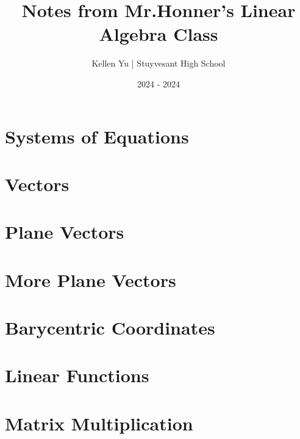 \documentclass[12pt]{book}
\title{Notes from Mr.Honner's Linear Algebra Class}
\author{Kellen Yu | Stuyvesant High School}
\date{2024 - 2024}
\begin{document}
    \maketitle
    \tableofcontents
    \section{Systems of Equations}
    
    \section{Vectors}
    
    \section{Plane Vectors}
    
    \section{More Plane Vectors}
    
    \section{Barycentric Coordinates}
    
    \section{Linear Functions}
    
    \section{Matrix Multiplication}
    
\end{document}
